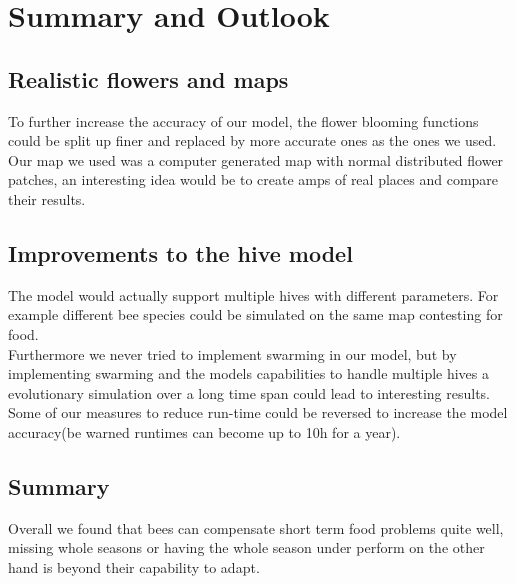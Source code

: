\section{Summary and Outlook}
\subsection{Realistic flowers and maps}
To further increase the accuracy of our model, the flower blooming functions could be split up finer and replaced by more accurate ones as the ones we used. Our map we used was a computer generated map with normal distributed flower patches, an interesting idea would be to create amps of real places and compare their results.
\subsection{Improvements to the hive model}
The model would actually support multiple hives with different parameters. For example different bee species could be simulated on the same map contesting for food. \\Furthermore we never tried to implement swarming in our model, but by implementing swarming and the models capabilities to handle multiple hives a evolutionary simulation over a long time span could lead to interesting results.\\Some of our measures to reduce run-time could be reversed to increase the model accuracy(be warned runtimes can become up to 10h for a year).
\subsection{Summary}
Overall we found that bees can compensate short term food problems quite well, missing whole seasons or having the whole season under perform on the other hand is beyond their capability to adapt. 